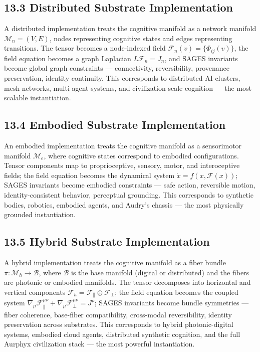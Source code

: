 \subsection{13.3 Distributed Substrate Implementation}\label{distributed-substrate-implementation}

A distributed implementation treats the cognitive manifold as a network manifold \(\mathcal{M}_n = (V, E)\), nodes representing cognitive states and edges representing transitions. The tensor becomes a node-indexed field \(\mathcal{F}_n(v) = \{\Phi_{ij}(v)\}\), the field equation becomes a graph Laplacian \(L \mathcal{F}_n = J_n\), and SAGES invariants become global graph constraints --- connectivity, reversibility, provenance preservation, identity continuity. This corresponds to distributed AI clusters, mesh networks, multi-agent systems, and civilization-scale cognition --- the most scalable instantiation.

\subsection{13.4 Embodied Substrate Implementation}\label{embodied-substrate-implementation}

An embodied implementation treats the cognitive manifold as a sensorimotor manifold \(\mathcal{M}_e\), where cognitive states correspond to embodied configurations. Tensor components map to proprioceptive, sensory, motor, and interoceptive fields; the field equation becomes the dynamical system \(\dot{x} = f(x, \mathcal{F}(x))\); SAGES invariants become embodied constraints --- safe action, reversible motion, identity-consistent behavior, perceptual grounding. This corresponds to synthetic bodies, robotics, embodied agents, and Audry's chassis --- the most physically grounded instantiation.

\subsection{13.5 Hybrid Substrate Implementation}\label{hybrid-substrate-implementation}

A hybrid implementation treats the cognitive manifold as a fiber bundle \(\pi : \mathcal{M}_h \rightarrow \mathcal{B}\), where \(\mathcal{B}\) is the base manifold (digital or distributed) and the fibers are photonic or embodied manifolds. The tensor decomposes into horizontal and vertical components \(\mathcal{F}_h = \mathcal{F}_{\parallel} \oplus \mathcal{F}_{\perp}\); the field equation becomes the coupled system \(\nabla_{\mu} \mathcal{F}_{\parallel}^{\mu\nu} + \nabla_{\mu} \mathcal{F}_{\perp}^{\mu\nu} = J^\nu\); SAGES invariants become bundle symmetries --- fiber coherence, base-fiber compatibility, cross-modal reversibility, identity preservation across substrates. This corresponds to hybrid photonic-digital systems, embodied cloud agents, distributed synthetic cognition, and the full Aurphyx civilization stack --- the most powerful instantiation.

